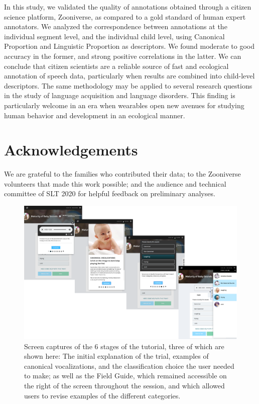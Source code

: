 \documentclass[
  english,
  ,man]{apa6}
\begin{document}
In this study, we validated the quality of annotations obtained through a citizen science platform, Zooniverse, as compared to a gold standard of human expert annotators. We analyzed the correspondence between annotations at the individual segment level, and the individual child level, using Canonical Proportion and Linguistic Proportion as descriptors. We found moderate to good accuracy in the former, and strong positive correlations in the latter. We can conclude that citizen scientists are a reliable source of fast and ecological annotation of speech data, particularly when results are combined into child-level descriptors. The same methodology may be applied to several research questions in the study of language acquisition and language disorders. This finding is particularly welcome in an era when wearables open new avenues for studying human behavior and development in an ecological manner.

\newpage

\hypertarget{acknowledgements}{%
\section{Acknowledgements}\label{acknowledgements}}

We are grateful to the families who contributed their data; to the Zooniverse volunteers that made this work possible; and the audience and technical committee of SLT 2020 for helpful feedback on preliminary analyses.

\begin{figure}
\centering
\includegraphics{zooniverse-pufig.pdf}
\caption{\label{fig:fig-zoo}Screen captures of the 6 stages of the tutorial, three of which are shown here: The initial explanation of the trial, examples of canonical vocalizations, and the classification choice the user needed to make; as well as the Field Guide, which remained accessible on the right of the screen throughout the session, and which allowed users to revise examples of the different categories.}
\end{figure}
\end{document}
